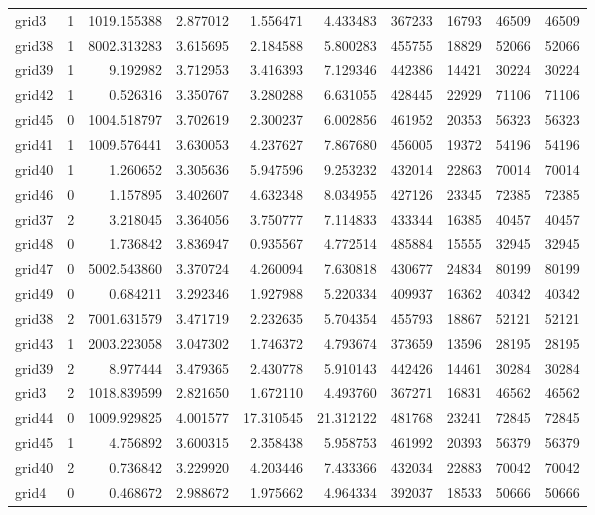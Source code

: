 \begin{longtable}{|l|r|r|r|r|r|r|r|r|r|}
grid3 & 1 & 1019.155388 & 2.877012 & 1.556471 & 4.433483 & 367233 & 16793 & 46509 & 46509 \\
grid38 & 1 & 8002.313283 & 3.615695 & 2.184588 & 5.800283 & 455755 & 18829 & 52066 & 52066 \\
grid39 & 1 & 9.192982 & 3.712953 & 3.416393 & 7.129346 & 442386 & 14421 & 30224 & 30224 \\
grid42 & 1 & 0.526316 & 3.350767 & 3.280288 & 6.631055 & 428445 & 22929 & 71106 & 71106 \\
grid45 & 0 & 1004.518797 & 3.702619 & 2.300237 & 6.002856 & 461952 & 20353 & 56323 & 56323 \\
grid41 & 1 & 1009.576441 & 3.630053 & 4.237627 & 7.867680 & 456005 & 19372 & 54196 & 54196 \\
grid40 & 1 & 1.260652 & 3.305636 & 5.947596 & 9.253232 & 432014 & 22863 & 70014 & 70014 \\
grid46 & 0 & 1.157895 & 3.402607 & 4.632348 & 8.034955 & 427126 & 23345 & 72385 & 72385 \\
grid37 & 2 & 3.218045 & 3.364056 & 3.750777 & 7.114833 & 433344 & 16385 & 40457 & 40457 \\
grid48 & 0 & 1.736842 & 3.836947 & 0.935567 & 4.772514 & 485884 & 15555 & 32945 & 32945 \\
grid47 & 0 & 5002.543860 & 3.370724 & 4.260094 & 7.630818 & 430677 & 24834 & 80199 & 80199 \\
grid49 & 0 & 0.684211 & 3.292346 & 1.927988 & 5.220334 & 409937 & 16362 & 40342 & 40342 \\
grid38 & 2 & 7001.631579 & 3.471719 & 2.232635 & 5.704354 & 455793 & 18867 & 52121 & 52121 \\
grid43 & 1 & 2003.223058 & 3.047302 & 1.746372 & 4.793674 & 373659 & 13596 & 28195 & 28195 \\
grid39 & 2 & 8.977444 & 3.479365 & 2.430778 & 5.910143 & 442426 & 14461 & 30284 & 30284 \\
grid3 & 2 & 1018.839599 & 2.821650 & 1.672110 & 4.493760 & 367271 & 16831 & 46562 & 46562 \\
grid44 & 0 & 1009.929825 & 4.001577 & 17.310545 & 21.312122 & 481768 & 23241 & 72845 & 72845 \\
grid45 & 1 & 4.756892 & 3.600315 & 2.358438 & 5.958753 & 461992 & 20393 & 56379 & 56379 \\
grid40 & 2 & 0.736842 & 3.229920 & 4.203446 & 7.433366 & 432034 & 22883 & 70042 & 70042 \\
grid4 & 0 & 0.468672 & 2.988672 & 1.975662 & 4.964334 & 392037 & 18533 & 50666 & 50666 \\

\end{longtable}
